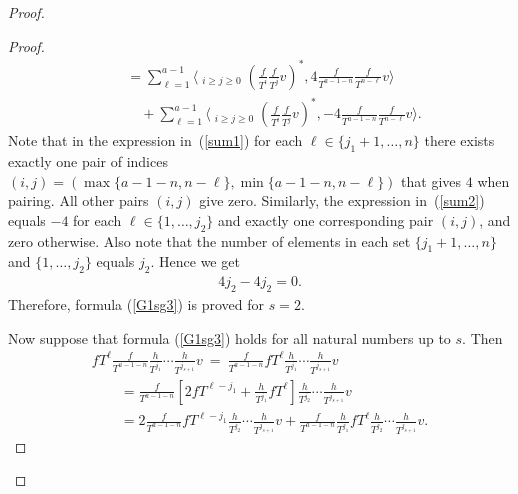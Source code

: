 \begin{proof}
\begin{proof}
\begin{gather}
\qquad{} = \sum_{\ell=1}^{a-1} \bigg\langle \mathop{\sum_{i+j=a-1-\ell}}_{i\geq j\geq 0}
\left(\frac{f}{T^i}\frac{f}{T^j}v\right)^*, 4 \frac{f}{T^{a-1-n}} \frac{f}{T^{n-\ell}} v \bigg\rangle \label{sum1} \\
\qquad\quad{} + \sum_{\ell=1}^{a-1} \bigg\langle \mathop{\sum_{i+j=a-1-\ell}}_{i\geq j\geq 0} \left(\frac{f}{T^i}\frac{f}{T^j}v\right)^*, -4 \frac{f}{T^{a-1-n}} \frac{f}{T^{n-\ell}} v \bigg\rangle. \label{sum2}
\end{gather}
Note that in the expression in~(\ref{sum1}) for each $\ell \in \{j_1 +1, \dots, n \}$ there exists exactly one pair of indices $(i,j) = (\max \{a-1-n, n-\ell \} , \min \{a-1-n, n-\ell\})$ that gives $4$ when pairing. All other pairs $(i,j)$ give zero. Similarly, the expression in~(\ref{sum2}) equals $-4$ for each $\ell \in \{1, \dots, j_2 \}$ and exactly one corresponding pair $(i,j)$, and zero otherwise. Also note that the number of elements in each set $\{j_1 +1, \dots, n \}$ and $\{1, \dots, j_2 \}$ equals $j_2$. Hence we get
\begin{gather*}
4 j_2 - 4 j_2 = 0.
\end{gather*}
Therefore, formula (\ref{G1sg3}) is proved for $s=2$.

Now suppose that formula (\ref{G1sg3}) holds for all natural numbers up to $s$. Then
\begin{gather}
fT^{\ell} \frac{f}{T^{a-1-n}} \frac{h}{T^{j_1}} \cdots \frac{h}{T^{j_{s+1}}} v\ =\
 \frac{f}{T^{a-1-n}} fT^{\ell} \frac{h}{T^{j_1}} \cdots \frac{h}{T^{j_{s+1}}} v \nonumber \\
\qquad{} = \frac{f}{T^{a-1-n}} \left[ 2 fT^{\ell-j_1} + \frac{h}{T^{j_1}} fT^{\ell} \right] \frac{h}{T^{j_2}} \cdots \frac{h}{T^{j_{s+1}}} v \nonumber \\
\qquad{} = 2 \frac{f}{T^{a-1-n}} fT^{\ell-j_1} \frac{h}{T^{j_2}} \cdots \frac{h}{T^{j_{s+1}}} v + \frac{f}{T^{a-1-n}} \frac{h}{T^{j_1}} fT^{\ell} \frac{h}{T^{j_2}} \cdots \frac{h}{T^{j_{s+1}}} v. \label{fs sum2}
\end{gather}


\end{proof}
\end{proof}
